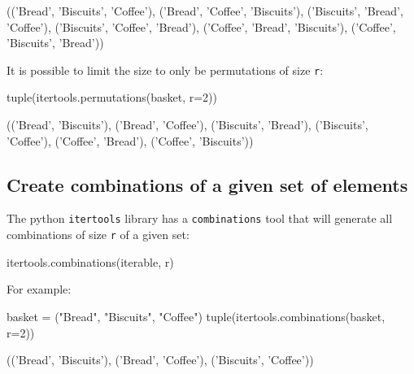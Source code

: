\begin{raw}
(('Bread', 'Biscuits', 'Coffee'),
 ('Bread', 'Coffee', 'Biscuits'),
 ('Biscuits', 'Bread', 'Coffee'),
 ('Biscuits', 'Coffee', 'Bread'),
 ('Coffee', 'Bread', 'Biscuits'),
 ('Coffee', 'Biscuits', 'Bread'))
\end{raw}





It is possible to limit the size to only be permutations of size \texttt{r}:




\begin{pyin}
tuple(itertools.permutations(basket, r=2))
\end{pyin}





\begin{raw}
(('Bread', 'Biscuits'),
 ('Bread', 'Coffee'),
 ('Biscuits', 'Bread'),
 ('Biscuits', 'Coffee'),
 ('Coffee', 'Bread'),
 ('Coffee', 'Biscuits'))
\end{raw}





\subsection{Create combinations of a given set of elements}
\label{\detokenize{tools-for-mathematics/05-combinations-permutations/how/main:creating-combinations-of-a-given-set-of-elements}}

The python \texttt{itertools} library has a \texttt{combinations} tool that
will generate all combinations of size \texttt{r} of a given set:


\begin{api}
itertools.combinations(iterable, r)
\end{api}



For example:




\begin{pyin}
basket = ("Bread", "Biscuits", "Coffee")
tuple(itertools.combinations(basket, r=2))
\end{pyin}





\begin{raw}
(('Bread', 'Biscuits'), ('Bread', 'Coffee'), ('Biscuits', 'Coffee'))
\end{raw}





